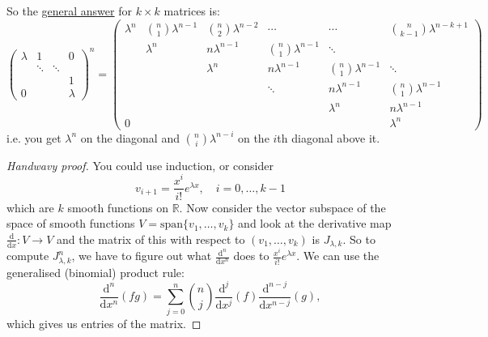 \documentclass[a4paper]{article}
\newcommand{\spanset}{\text{span}}
\theoremstyle{definition}
\begin{document}
So the \underline{general answer} for $k\times k$ matrices is:
\[
\begin{pmatrix}
\lambda & 1 & & 0 \\
& \ddots & \ddots & \\
&&& 1\\
0& & &\lambda
\end{pmatrix}^n = \begin{pmatrix}
\lambda^n &{n\choose 1}\lambda^{n-1}&{n\choose 2}\lambda^{n-2}&\cdots&\cdots&{n\choose k-1}\lambda^{n-k+1}\\
&\lambda^n &n\lambda^{n-1}&{n\choose 1}\lambda^{n-1}&\ddots&\\
&&\lambda^n &n\lambda^{n-1}&{n\choose 1}\lambda^{n-1}&\ddots\\
&&&\ddots &n\lambda^{n-1}&{n\choose 1}\lambda^{n-1}\\
&&&&\lambda ^n &n\lambda^{n-1}\\
0&&&&&\lambda ^n
\end{pmatrix}
\]
i.e. you get $\lambda^n$ on the diagonal and ${n\choose i}\lambda^{n-i}$ on the $i$th diagonal above it.

\begin{proof}[Handwavy proof]
You could use induction, or consider
\[
v_{i+1}=\frac{x^i}{i!}e^{\lambda x},\quad i=0,\ldots,k-1
\]
which are $k$ smooth functions on $\mathbb R$. Now consider the vector subspace of the space of smooth functions $V=\spanset \{v_1,\ldots,v_k\}$ and look at the derivative map $\frac{\mathrm d}{\mathrm d x}:V\rightarrow V$ and the matrix of this with respect to $(v_1,\ldots,v_k)$ is $J_{\lambda ,k}$. So to compute $J_{\lambda ,k}^n$, we have to figure out what $\displaystyle \frac{\mathrm d^n}{\mathrm d x^n}$ does to $\displaystyle \frac{x^i}{i!}e^{\lambda x}$. We can use the generalised (binomial) product rule:
\[
\frac{\mathrm d^n}{\mathrm d x^n}(fg)=\sum_{j=0}^n {n\choose j} \frac{\mathrm d ^j}{\mathrm d x^j} (f) \frac{\mathrm d^{n-j}}{\mathrm d x^{n-j}} (g),
\]
which gives us entries of the matrix.
\end{proof}
\end{document}

